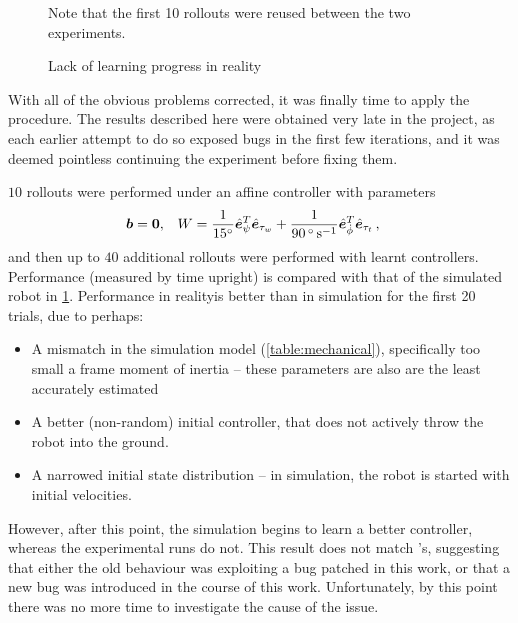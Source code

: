 \documentclass[main.tex]{subfiles}
\begin{document}
	\begin{figure}[b!]
		\centering
		\begin{minipage}{0.5\linewidth - 2em}
			
		\end{minipage}\hfill
		\begin{minipage}{0.5\linewidth - 2em}
			
		\end{minipage}
		\caption{Lack of learning progress in reality}
		\label{fig:learning-compare}
		\medskip
		\small
		Note that the first 10 rollouts were reused between the two experiments.
	\end{figure}

	With all of the obvious problems corrected, it was finally time to apply the {\Pilco} procedure.
	The results described here were obtained very late in the project, as each earlier attempt to do so exposed bugs in the first few iterations, and it was deemed pointless continuing the experiment before fixing them.

	$10$ rollouts were performed under an affine controller with parameters
	\begin{align}
		\bm{b} &= \bm{0}, &
		W &=
			\frac{1}{\SI{15}{\degree}}
			\hat{\bm{e}}_{\psi}^T\hat{\bm{e}}_{\tau_w}
			+ \frac{1}{\SI{90}{\degree\per\second}}
			\hat{\bm{e}}_{\dot\phi}^T\hat{\bm{e}}_{\tau_t}\,,
	\end{align}
	and then up to $40$ additional rollouts were performed with learnt controllers.
	Performance (measured by time upright) is compared with that of the simulated robot in \cref{fig:learning-compare}.
	Performance in reality\footnotemark is better than in simulation for the first 20 trials, due to perhaps:
	\begin{itemize}[noitemsep]
		\item A mismatch in the simulation model (\cref{table:mechanical}), specifically too small a frame moment of inertia -- these parameters are also are the least accurately estimated
		\item A better (non-random) initial controller, that does not actively throw the robot into the ground.
		\item A narrowed initial state distribution -- in simulation, the robot is started with initial velocities.
	\end{itemize}
	However, after this point, the simulation begins to learn a better controller, whereas the experimental runs do not.
	This result does not match \cite{aleksi}'s, suggesting that either the old behaviour was exploiting a bug patched in this work, or that a new bug was introduced in the course of this work. Unfortunately, by this point there was no more time to investigate the cause of the issue.
\end{document}
